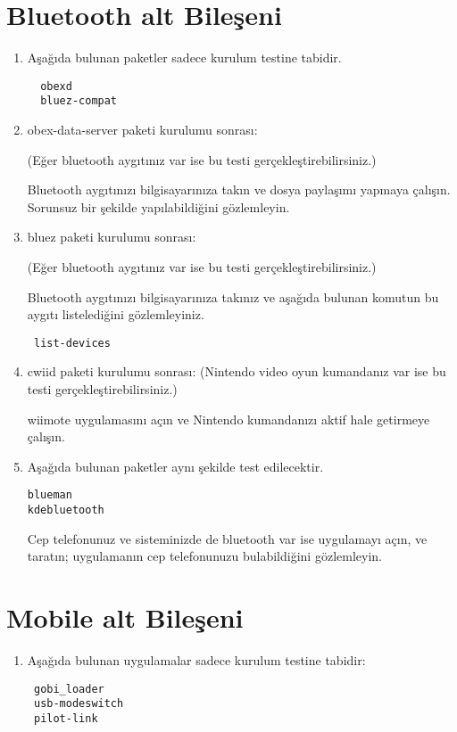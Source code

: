 \documentclass[a4paper,10pt]{article}
\begin{document}
\section{Bluetooth alt Bileşeni}
\begin{enumerate}
\item Aşağıda bulunan paketler sadece kurulum testine tabidir. 
\begin{verbatim}
  obexd
  bluez-compat
\end{verbatim}

 \item obex-data-server paketi kurulumu sonrası: 
 
(Eğer bluetooth aygıtınız var ise bu testi gerçekleştirebilirsiniz.)

Bluetooth aygıtınızı bilgisayarınıza takın ve dosya paylaşımı yapmaya çalışın. Sorunsuz bir şekilde yapılabildiğini gözlemleyin.
 \item bluez paketi kurulumu sonrası: 
 
(Eğer bluetooth aygıtınız var ise bu testi gerçekleştirebilirsiniz.)

Bluetooth aygıtınızı bilgisayarınıza takınız ve aşağıda bulunan komutun bu aygıtı listelediğini gözlemleyiniz.
\begin{verbatim}
 list-devices
\end{verbatim}

 \item cwiid paketi kurulumu sonrası: (Nintendo video oyun kumandanız var ise bu testi gerçekleştirebilirsiniz.)

wiimote uygulamasını açın ve Nintendo kumandanızı aktif hale getirmeye çalışın.

\item Aşağıda bulunan paketler aynı şekilde test edilecektir.
\begin{verbatim}
blueman
kdebluetooth 
\end{verbatim}

Cep telefonunuz ve sisteminizde de bluetooth var ise uygulamayı açın, ve taratın; uygulamanın cep telefonunuzu bulabildiğini gözlemleyin.
\end{enumerate}

\section{Mobile alt Bileşeni}
\begin{enumerate}
 \item Aşağıda bulunan uygulamalar sadece kurulum testine tabidir:
\begin{verbatim}
 gobi_loader
 usb-modeswitch
 pilot-link
\end{verbatim}

\end{enumerate}
\end{document}
